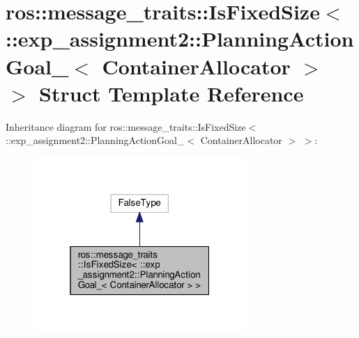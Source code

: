 \hypertarget{structros_1_1message__traits_1_1IsFixedSize_3_01_1_1exp__assignment2_1_1PlanningActionGoal___3_01ContainerAllocator_01_4_01_4}{}\section{ros\+:\+:message\+\_\+traits\+:\+:Is\+Fixed\+Size$<$ \+:\+:exp\+\_\+assignment2\+:\+:Planning\+Action\+Goal\+\_\+$<$ Container\+Allocator $>$ $>$ Struct Template Reference}
\label{structros_1_1message__traits_1_1IsFixedSize_3_01_1_1exp__assignment2_1_1PlanningActionGoal___3_01ContainerAllocator_01_4_01_4}


Inheritance diagram for ros\+:\+:message\+\_\+traits\+:\+:Is\+Fixed\+Size$<$ \+:\+:exp\+\_\+assignment2\+:\+:Planning\+Action\+Goal\+\_\+$<$ Container\+Allocator $>$ $>$\+:
\nopagebreak
\begin{figure}[H]
\begin{center}
\leavevmode
\includegraphics[width=229pt]{structros_1_1message__traits_1_1IsFixedSize_3_01_1_1exp__assignment2_1_1PlanningActionGoal___3_0f94a734bde303c7574bac682dfe5c883}
\end{center}
\end{figure}


